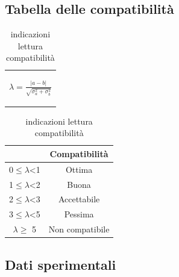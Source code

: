 \documentclass{article}
\begin{document}
\subsection{Tabella delle compatibilità}
\medskip
\begin{table}[H]
    \centering
    \begin{tabular}{c}
        \begin{Large}
        $\lambda=\frac{|a-b|}{\sqrt{\sigma_a^2+\sigma_b^2}}$
        \end{Large}\\
    \end{tabular}
    \hspace{0.5cm}
    \begin{tabular}{cc}
        \toprule
        &       \textbf{Compatibilità   }       \\
        \midrule
        0$\leq \lambda$<1   &Ottima                 \\
        1$\leq \lambda$<2   &Buona                  \\
        2$\leq \lambda$<3   &Accettabile            \\
        3$\leq\lambda$<5   &Pessima                \\
        $ \lambda \geq $  5     &Non compatibile        \\
        \bottomrule
    \end{tabular}
    \caption{indicazioni lettura compatibilità}
    \label{tab:compatibilità}
\end{table}

\subsection{Dati sperimentali}


   
\end{document}
